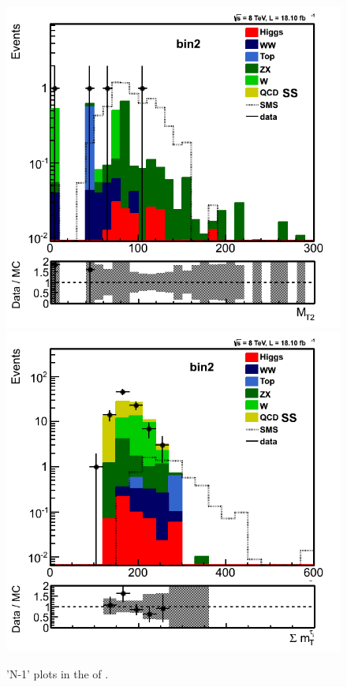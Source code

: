 \begin{figure}[!Hhtb]
\includegraphics[angle=0,scale=0.35]{TauTauFigs/MT2_bin2_14nov.png} 
\includegraphics[angle=0,scale=0.35]{TauTauFigs/summt_bin2_15nov.png}
\caption{'N-1' plots in the \bintwo of \tauTau.}
\label{fig:bin2}
\end{figure}





